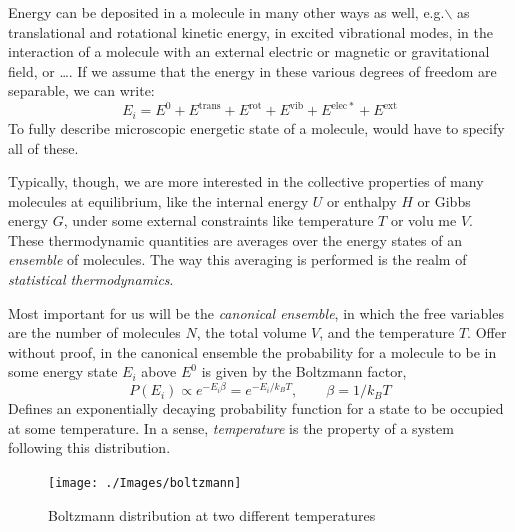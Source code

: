 \documentclass[11pt]{article}
\begin{document}
Energy can be deposited in a molecule in many other ways as well, e.g.$\backslash$ as
translational and rotational kinetic energy, in excited vibrational modes, in
the interaction of a molecule with an external electric or magnetic or
gravitational field, or \ldots{}.  If we assume that the energy in these various
degrees of freedom are separable, we can write:
\begin{equation}
  E_i=E^0+E^\mathrm{trans}+E^\mathrm{rot}+E^\mathrm{vib} +E^\mathrm{elec*}+E^\mathrm{ext}
\end{equation}
To fully describe microscopic energetic state of a molecule, would have to
specify all of these.

Typically, though, we are more interested in the collective properties of many
molecules at equilibrium, like the internal energy \(U\) or enthalpy \(H\) or Gibbs
energy \(G\), under some external constraints like temperature \(T\) or volu
me \(V\).  These thermodynamic quantities are averages over the energy states of
an \emph{ensemble} of molecules.  The way this averaging is performed is the
realm of \emph{statistical thermodynamics}.

Most important for us will be the \emph{canonical ensemble}, in which the free
variables are the number of molecules \(N\), the total volume \(V\), and the
temperature \(T\).  Offer without proof, in the canonical ensemble the
probability for a molecule to be in some energy state \(E_i\) above \(E^0\) is
given by the Boltzmann factor,
\begin{equation}
  P(E_i) \propto e^{-E_i\beta}=e^{-E_i/k_BT},\qquad\beta=1/k_BT
\end{equation}
Defines an exponentially decaying probability function for a state to be
occupied at some temperature.  In a sense, \emph{temperature} is the property of
a system following this distribution.
\begin{figure}[h]
  \centering
  \texttt{[image: ./Images/boltzmann]}
  \caption{Boltzmann distribution at two different temperatures}
  \label{fig:boltzmann}
\end{figure}
\end{document}
